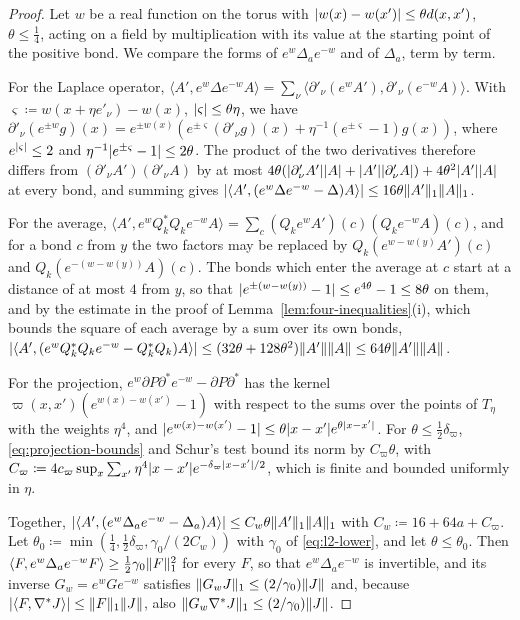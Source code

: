 \documentclass[11pt]{preprint}
\DeclarePairedDelimiter{\abs}{\lvert}{\rvert}
\DeclarePairedDelimiter{\norm}{\lVert}{\rVert}
\numberwithin{equation}{section}
\theoremstyle{definition}
\theoremstyle{remark}
\theoremstyle{plain}
\begin{document}
\begin{proof}
Let $w$ be a real function on the torus with $\abs{w(x) - w(x')} \leq \theta d(x, x')$, $\theta \leq \frac14$, acting on a field by multiplication with its value at the starting point of the positive bond. We compare the forms of $e^w\Delta_ae^{-w}$ and of $\Delta_a$, term by term.

For the Laplace operator, $\langle A', e^w\Delta e^{-w}A\rangle = \sum_\nu\langle\partial'_\nu(e^wA'), \partial'_\nu(e^{-w}A)\rangle$. With $\varsigma \coloneqq w(x + \eta e'_\nu) - w(x)$, $\abs\varsigma \leq \theta\eta$, we have $\partial'_\nu(e^{\pm w}g)(x) = e^{\pm w(x)}(e^{\pm\varsigma}(\partial'_\nu g)(x) + \eta^{-1}(e^{\pm\varsigma} - 1)g(x))$, where $e^{\abs\varsigma} \leq 2$ and $\eta^{-1}\abs{e^{\pm\varsigma} - 1} \leq 2\theta$. The product of the two derivatives therefore differs from $(\partial'_\nu A')(\partial'_\nu A)$ by at most $4\theta(\abs{\partial'_\nu A'}\abs A + \abs{A'}\abs{\partial'_\nu A}) + 4\theta^2\abs{A'}\abs A$ at every bond, and summing gives $\abs{\langle A', (e^w\Delta e^{-w} - \Delta)A\rangle} \leq 16\theta\norm{A'}_1\norm{A}_1$.

For the average, $\langle A', e^wQ_k^*Q_ke^{-w}A\rangle = \sum_c(Q_ke^wA')(c)(Q_ke^{-w}A)(c)$, and for a bond $c$ from $y$ the two factors may be replaced by $Q_k(e^{w - w(y)}A')(c)$ and $Q_k(e^{-(w - w(y))}A)(c)$. The bonds which enter the average at $c$ start at a distance of at most $4$ from $y$, so that $\abs{e^{\pm(w - w(y))} - 1} \leq e^{4\theta} - 1 \leq 8\theta$ on them, and by the estimate in the proof of Lemma~\ref{lem:four-inequalities}(i), which bounds the square of each average by a sum over its own bonds, $\abs{\langle A', (e^wQ_k^*Q_ke^{-w} - Q_k^*Q_k)A\rangle} \leq (32\theta + 128\theta^2)\norm{A'}\norm{A} \leq 64\theta\norm{A'}\norm{A}$.

For the projection, $e^w\partial P\partial^*e^{-w} - \partial P\partial^*$ has the kernel $\varpi(x, x')(e^{w(x) - w(x')} - 1)$ with respect to the sums over the points of $T_\eta$ with the weights $\eta^4$, and $\abs{e^{w(x) - w(x')} - 1} \leq \theta\abs{x - x'}e^{\theta\abs{x - x'}}$. For $\theta \leq \frac12\delta_\varpi$, \eqref{eq:projection-bounds} and Schur's test bound its norm by $C_\varpi\theta$, with $C_\varpi \coloneqq 4c_\varpi\sup_x\sum_{x'}\eta^4\abs{x - x'}e^{-\delta_\varpi\abs{x - x'}/2}$, which is finite and bounded uniformly in $\eta$.

Together, $\abs{\langle A', (e^w\Delta_ae^{-w} - \Delta_a)A\rangle} \leq C_w\theta\norm{A'}_1\norm{A}_1$ with $C_w \coloneqq 16 + 64a + C_\varpi$. Let $\theta_0 \coloneqq \min(\frac14, \frac12\delta_\varpi, \gamma_0/(2C_w))$ with $\gamma_0$ of \eqref{eq:l2-lower}, and let $\theta \leq \theta_0$. Then $\langle F, e^w\Delta_ae^{-w}F\rangle \geq \frac12\gamma_0\norm{F}_1^2$ for every $F$, so that $e^w\Delta_ae^{-w}$ is invertible, and its inverse $G_w = e^wGe^{-w}$ satisfies $\norm{G_wJ}_1 \leq (2/\gamma_0)\norm{J}$ and, because $\abs{\langle F, \nabla^*J\rangle} \leq \norm{F}_1\norm{J}$, also $\norm{G_w\nabla^*J}_1 \leq (2/\gamma_0)\norm{J}$.


\end{proof}
\end{document}
